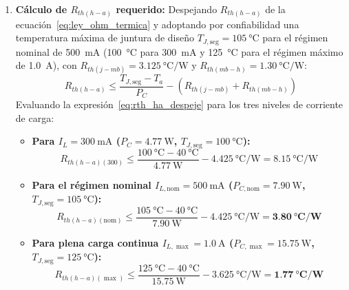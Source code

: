 \begin{enumerate}
    \item \textbf{Cálculo de $R_{th(h-a)}$ requerido:} Despejando $R_{th(h-a)}$ de la ecuación~\eqref{eq:ley_ohm_termica} y adoptando por confiabilidad una temperatura máxima de juntura de diseño $T_{J,\text{seg}} = \SI{105}{\celsius}$ para el régimen nominal de \SI{500}{\milli\ampere} (\SI{100}{\celsius} para \SI{300}{\milli\ampere} y \SI{125}{\celsius} para el régimen máximo de \SI{1,0}{\ampere}), con $R_{th(j-mb)} = \SI{3,125}{\celsius\per\watt}$ y $R_{th(mb-h)} = \SI{1,30}{\celsius\per\watt}$:
    \begin{equation}
        R_{th(h-a)} \le \frac{T_{J,\text{seg}} - T_a}{P_C} - \left( R_{th(j-mb)} + R_{th(mb-h)} \right)
        \label{eq:rth_ha_despeje}
    \end{equation}
    Evaluando la expresión~\eqref{eq:rth_ha_despeje} para los tres niveles de corriente de carga:
    \begin{itemize}
        \item \textbf{Para $I_L = \SI{300}{\milli\ampere}$ ($P_C = \SI{4,77}{\watt}$, $T_{J,\text{seg}} = \SI{100}{\celsius}$):}
        \begin{equation}
            R_{th(h-a)(300)} \le \frac{\SI{100}{\celsius} - \SI{40}{\celsius}}{\SI{4,77}{\watt}} - \SI{4,425}{\celsius\per\watt} = \SI{8,15}{\celsius\per\watt}
        \end{equation}
        \item \textbf{Para el régimen nominal $I_{L,\text{nom}} = \SI{500}{\milli\ampere}$ ($P_{C,\text{nom}} = \SI{7,90}{\watt}$, $T_{J,\text{seg}} = \SI{105}{\celsius}$):}
        \begin{equation}
            R_{th(h-a)(\text{nom})} \le \frac{\SI{105}{\celsius} - \SI{40}{\celsius}}{\SI{7,90}{\watt}} - \SI{4,425}{\celsius\per\watt} = \mathbf{\SI{3,80}{\celsius\per\watt}}
            \label{eq:rth_ha_500}
        \end{equation}
        \item \textbf{Para plena carga continua $I_{L,\max} = \SI{1,0}{\ampere}$ ($P_{C,\max} = \SI{15,75}{\watt}$, $T_{J,\text{seg}} = \SI{125}{\celsius}$):}
        \begin{equation}
            R_{th(h-a)(\max)} \le \frac{\SI{125}{\celsius} - \SI{40}{\celsius}}{\SI{15,75}{\watt}} - \SI{3,625}{\celsius\per\watt} = \mathbf{\SI{1,77}{\celsius\per\watt}}
            \label{eq:rth_ha_1000}
        \end{equation}
    \end{itemize}


\end{enumerate}
